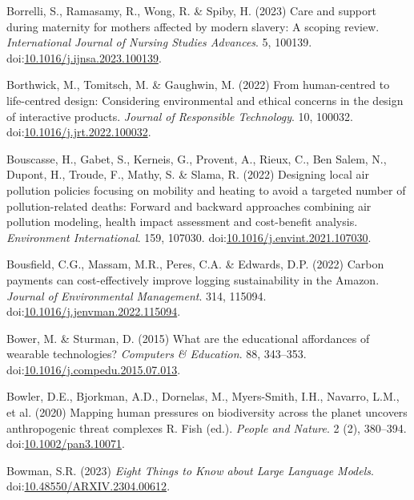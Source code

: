 \documentclass[
  letterpaper,
  DIV=11,
  numbers=noendperiod]{scrartcl}
\newlength{\cslhangindent}
\newenvironment{CSLReferences}[2] %
 {\begin{list}{}{%
  \setlength{\itemindent}{0pt}
  \setlength{\leftmargin}{0pt}
  \setlength{\parsep}{0pt}
  \ifodd #1
   \setlength{\leftmargin}{\cslhangindent}
   \setlength{\itemindent}{-1\cslhangindent}
  \fi
  \setlength{\itemsep}{#2\baselineskip}}}
 {\end{list}}
\begin{document}
\begin{CSLReferences}{0}{1}
Borrelli, S., Ramasamy, R., Wong, R. \& Spiby, H. (2023) Care and
support during maternity for mothers affected by modern slavery: {A}
scoping review. \emph{International Journal of Nursing Studies
Advances}. 5, 100139.
doi:\href{https://doi.org/10.1016/j.ijnsa.2023.100139}{10.1016/j.ijnsa.2023.100139}.

Borthwick, M., Tomitsch, M. \& Gaughwin, M. (2022) From human-centred to
life-centred design: {Considering} environmental and ethical concerns in
the design of interactive products. \emph{Journal of Responsible
Technology}. 10, 100032.
doi:\href{https://doi.org/10.1016/j.jrt.2022.100032}{10.1016/j.jrt.2022.100032}.

Bouscasse, H., Gabet, S., Kerneis, G., Provent, A., Rieux, C., Ben
Salem, N., Dupont, H., Troude, F., Mathy, S. \& Slama, R. (2022)
Designing local air pollution policies focusing on mobility and heating
to avoid a targeted number of pollution-related deaths: {Forward} and
backward approaches combining air pollution modeling, health impact
assessment and cost-benefit analysis. \emph{Environment International}.
159, 107030.
doi:\href{https://doi.org/10.1016/j.envint.2021.107030}{10.1016/j.envint.2021.107030}.

Bousfield, C.G., Massam, M.R., Peres, C.A. \& Edwards, D.P. (2022)
Carbon payments can cost-effectively improve logging sustainability in
the {Amazon}. \emph{Journal of Environmental Management}. 314, 115094.
doi:\href{https://doi.org/10.1016/j.jenvman.2022.115094}{10.1016/j.jenvman.2022.115094}.

Bower, M. \& Sturman, D. (2015) What are the educational affordances of
wearable technologies? \emph{Computers \& Education}. 88, 343--353.
doi:\href{https://doi.org/10.1016/j.compedu.2015.07.013}{10.1016/j.compedu.2015.07.013}.

Bowler, D.E., Bjorkman, A.D., Dornelas, M., Myers-Smith, I.H., Navarro,
L.M., et al. (2020) Mapping human pressures on biodiversity across the
planet uncovers anthropogenic threat complexes R. Fish (ed.).
\emph{People and Nature}. 2 (2), 380--394.
doi:\href{https://doi.org/10.1002/pan3.10071}{10.1002/pan3.10071}.

Bowman, S.R. (2023) \emph{Eight {Things} to {Know} about {Large Language
Models}}.
doi:\href{https://doi.org/10.48550/ARXIV.2304.00612}{10.48550/ARXIV.2304.00612}.


\end{CSLReferences}
\end{document}
